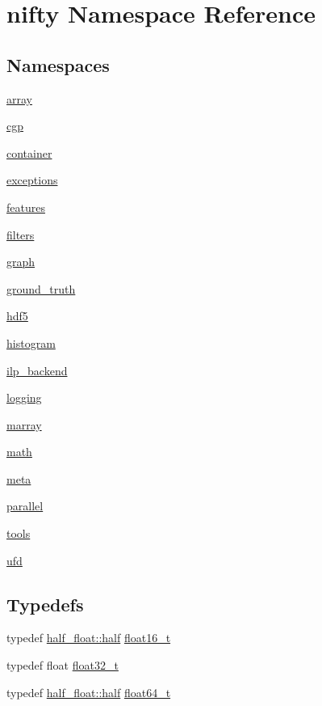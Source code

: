 \hypertarget{namespacenifty}{}\section{nifty Namespace Reference}
\label{namespacenifty}
\subsection*{Namespaces}
\begin{DoxyCompactItemize}
\item 
 \hyperlink{namespacenifty_1_1array}{array}
\item 
 \hyperlink{namespacenifty_1_1cgp}{cgp}
\item 
 \hyperlink{namespacenifty_1_1container}{container}
\item 
 \hyperlink{namespacenifty_1_1exceptions}{exceptions}
\item 
 \hyperlink{namespacenifty_1_1features}{features}
\item 
 \hyperlink{namespacenifty_1_1filters}{filters}
\item 
 \hyperlink{namespacenifty_1_1graph}{graph}
\item 
 \hyperlink{namespacenifty_1_1ground__truth}{ground\+\_\+truth}
\item 
 \hyperlink{namespacenifty_1_1hdf5}{hdf5}
\item 
 \hyperlink{namespacenifty_1_1histogram}{histogram}
\item 
 \hyperlink{namespacenifty_1_1ilp__backend}{ilp\+\_\+backend}
\item 
 \hyperlink{namespacenifty_1_1logging}{logging}
\item 
 \hyperlink{namespacenifty_1_1marray}{marray}
\item 
 \hyperlink{namespacenifty_1_1math}{math}
\item 
 \hyperlink{namespacenifty_1_1meta}{meta}
\item 
 \hyperlink{namespacenifty_1_1parallel}{parallel}
\item 
 \hyperlink{namespacenifty_1_1tools}{tools}
\item 
 \hyperlink{namespacenifty_1_1ufd}{ufd}
\end{DoxyCompactItemize}
\subsection*{Typedefs}
\begin{DoxyCompactItemize}
\item 
typedef \hyperlink{classhalf__float_1_1half}{half\+\_\+float\+::half} \hyperlink{namespacenifty_a20031b62bd5c16b943905d43a8ed361a}{float16\+\_\+t}
\item 
typedef float \hyperlink{namespacenifty_a9ffa17ecb889a664e4fc76e1735a1d77}{float32\+\_\+t}
\item 
typedef \hyperlink{classhalf__float_1_1half}{half\+\_\+float\+::half} \hyperlink{namespacenifty_a86e0138624471d998bfa1c2836c9ad7e}{float64\+\_\+t}
\end{DoxyCompactItemize}
